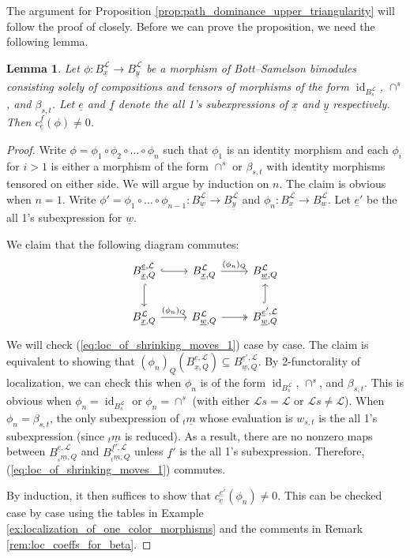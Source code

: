 \documentclass{amsart}
\newcommand{\scrL}{\mathcal{L}}
\DeclareMathOperator{\id}{id}
\newcommand{\ue}{\underline{e}}
\newcommand{\uf}{\underline{f}}
\newcommand{\uw}{\underline{w}}
\newcommand{\ux}{\underline{x}}
\newcommand{\uy}{\underline{y}}
\newtheorem{lemma}[subsubsection]{Lemma}
\theoremstyle{definition}
\numberwithin{equation}{subsection}
\begin{document}
The argument for Proposition \ref{prop:path_dominance_upper_triangularity} will follow the proof of \cite[Proposition 6.6]{EW} closely.
Before we can prove the proposition, we need the following lemma.
\begin{lemma}\label{lem:loc_of_shrinking_expression_moves}
    Let $\phi : B_{\ux}^{\scrL} \to B_{\uy}^{\scrL}$ be a morphism of Bott--Samelson bimodules consisting solely of compositions and tensors of morphisms of the form $\id_{B_s^{\scrL}}$, $\cap^s$, and $\beta_{s,t}$.
    Let $\ue$ and $\uf$ denote the all 1's subexpressions of $\ux$ and $\uy$ respectively.
    Then $c_{\ue}^{\uf} (\phi) \neq 0$. 
\end{lemma}
\begin{proof}
    Write $\phi = \phi_1 \circ \phi_{2} \circ \ldots \circ \phi_n$ such that $\phi_1$ is an identity morphism and each $\phi_i$ for $i > 1$ is either a morphism of the form $\cap^s$ or $\beta_{s,t}$ with identity morphisms tensored on either side.
    We will argue by induction on $n$. The claim is obvious when $n = 1$.
    Write $\phi' = \phi_1 \circ \ldots \circ \phi_{n-1} : B_{\uw}^{\scrL} \to B_{\uy}^{\scrL}$ and $\phi_n : B_{\ux}^{\scrL} \to B_{\uw}^{\scrL}$.
    Let $\ue'$ be the all 1's subexpression for $\uw$. 
    
    We claim that the following diagram commutes:
    \begin{equation}\label{eq:loc_of_shrinking_moves_1}
        \begin{tikzcd}
            {B_{\ux, Q}^{\ue, \scrL}} \arrow[r, hook] \arrow[d, hook] & {B_{\ux, Q}^{\scrL}} \arrow[r, "(\phi_n)_Q"]  & {B_{\uw, Q}^{\scrL}}                       \\
            {B_{\ux, Q}^{\scrL}} \arrow[r, "(\phi_n)_Q"]                  & {B_{\uw, Q}^{\scrL}} \arrow[r, two heads] & {B_{\uw, Q}^{\ue', \scrL}} \arrow[u, hook]
            \end{tikzcd}
    \end{equation}
    We will check (\ref{eq:loc_of_shrinking_moves_1}) case by case.
    The claim is equivalent to showing that $(\phi_n)_Q \left( B_{\ux, Q}^{\ue, \scrL} \right) \subseteq B_{\uw, Q}^{\ue', \scrL}$. By 2-functorality of localization, we can check this when $\phi_n$ is of the form $\id_{B_s^{\scrL}}$, $\cap^s$, and $\beta_{s,t}$.
    This is obvious when $\phi_n = \id_{B_s^{\scrL}}$ or $\phi_n = \cap^s$ (with either $\scrL s = \scrL$ or $\scrL s \neq \scrL$). 
    When $\phi_n = \beta_{s,t}$, the only subexpression of ${}_t \underline{m}$ whose evaluation is $w_{s,t}$ is the all 1's subexpression (since ${}_t \underline{m}$ is reduced).
    As a result, there are no nonzero maps between $B_{{}_s \underline{m}, Q}^{\ue, \scrL}$ and $B_{{}_t \underline{m}, Q}^{\uf', \scrL}$ unless $\uf'$ is the all 1's subexpression.
    Therefore, (\ref{eq:loc_of_shrinking_moves_1}) commutes. 

    By induction, it then suffices to show that $c_{\ue}^{\ue'} (\phi_n) \neq 0$. This can be checked case by case using the tables in Example \ref{ex:localization_of_one_color_morphisms} and the comments in Remark \ref{rem:loc_coeffs_for_beta}.
\end{proof}
\end{document}

